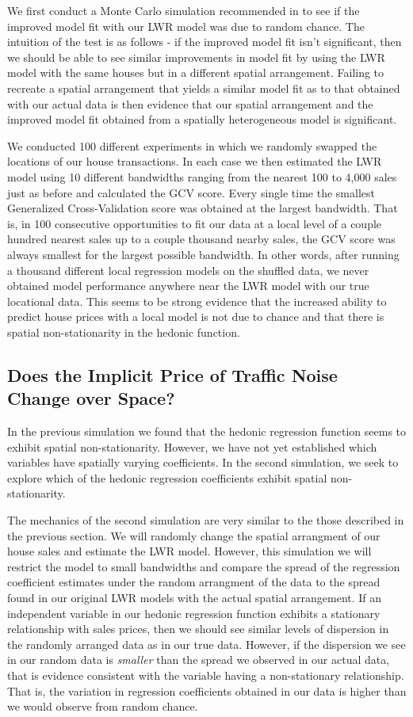 \documentclass{article}\usepackage{graphicx, color}
\begin{document}
We first conduct a Monte Carlo simulation recommended in \citet{Fotheringham2002} to see if the improved model fit with our LWR model was due to random chance. The intuition of the test is as follows - if the improved model fit isn't significant, then we should be able to see similar improvements in model fit by using the LWR model with the same houses but in a different spatial arrangement. Failing to recreate a spatial arrangement that yields a similar model fit as to that obtained with our actual data is then evidence that our spatial arrangement and the improved model fit obtained from a spatially heterogeneous model is significant. 

We conducted 100 different experiments in which we randomly swapped the locations of our house transactions. In each case we then estimated the LWR model using 10 different bandwidths ranging from the nearest 100 to 4,000 sales just as before and calculated the GCV score. Every single time the smallest Generalized Cross-Validation score was obtained at the largest bandwidth. That is, in 100 consecutive opportunities to fit our data at a local level of a couple hundred nearest sales up to a couple thousand nearby sales, the GCV score was always smallest for the largest possible bandwidth. In other words, after running a thousand different local regression models on the shuffled data, we never obtained model performance anywhere near the LWR model with our true locational data. This seems to be strong evidence that the increased ability to predict house prices with a local model is not due to chance and that there is spatial non-stationarity in the hedonic function.

\subsection{Does the Implicit Price of Traffic Noise Change over Space?}
In the previous simulation we found that the hedonic regression function seems to exhibit spatial non-stationarity. However, we have not yet established which variables have spatially varying coefficients. In the second simulation, we seek to explore which of the hedonic regression coefficients exhibit spatial non-stationarity.

The mechanics of the second simulation are very similar to the those described in the previous section. We will randomly change the spatial arrangment of our house sales and estimate the LWR model. However, this simulation we will restrict the model to small bandwidths and compare the spread of the regression coefficient estimates under the random arrangment of the data to the spread found in our original LWR models with the actual spatial arrangement. If an independent variable in our hedonic regression function exhibits a stationary relationship with sales prices, then we should see similar levels of dispersion in the randomly arranged data as in our true data. However, if the dispersion we see in our random data is \emph{smaller} than the spread we observed in our actual data, that is evidence consistent with the variable having a non-stationary relationship. That is, the variation in regression coefficients obtained in our data is higher than we would observe from random chance. 
\end{document}
